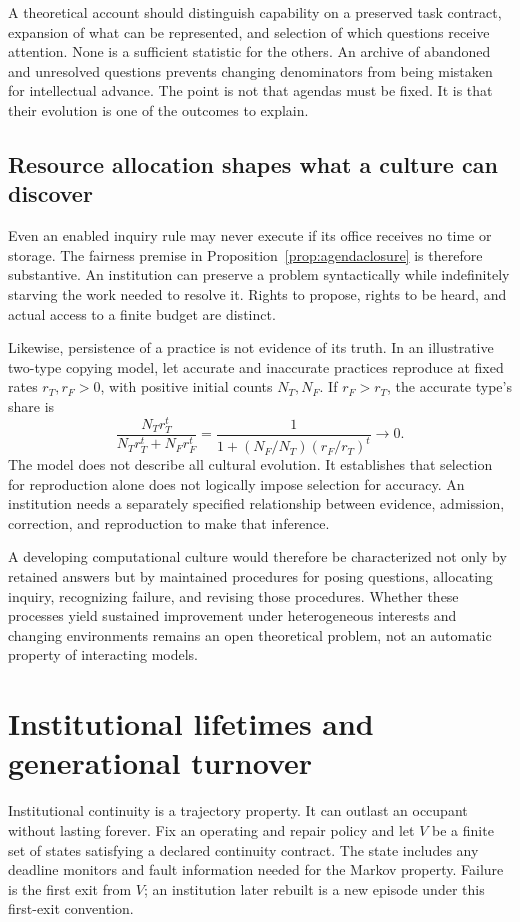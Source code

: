 \documentclass[11pt,letterpaper]{article}
\theoremstyle{plain}
\theoremstyle{definition}
\theoremstyle{remark}
\begin{document}
A theoretical account should distinguish capability on a preserved task contract, expansion of what can be represented, and selection of which questions receive attention. None is a sufficient statistic for the others. An archive of abandoned and unresolved questions prevents changing denominators from being mistaken for intellectual advance. The point is not that agendas must be fixed. It is that their evolution is one of the outcomes to explain.

\subsection{Resource allocation shapes what a culture can discover}
Even an enabled inquiry rule may never execute if its office receives no time or storage. The fairness premise in Proposition~\ref{prop:agendaclosure} is therefore substantive. An institution can preserve a problem syntactically while indefinitely starving the work needed to resolve it. Rights to propose, rights to be heard, and actual access to a finite budget are distinct.

Likewise, persistence of a practice is not evidence of its truth. In an illustrative two-type copying model, let accurate and inaccurate practices reproduce at fixed rates $r_T,r_F>0$, with positive initial counts $N_T,N_F$. If $r_F>r_T$, the accurate type's share is
\[
\frac{N_T r_T^t}{N_T r_T^t+N_F r_F^t}
=\frac{1}{1+(N_F/N_T)(r_F/r_T)^t}\longrightarrow0.
\]
The model does not describe all cultural evolution. It establishes that selection for reproduction alone does not logically impose selection for accuracy. An institution needs a separately specified relationship between evidence, admission, correction, and reproduction to make that inference.

A developing computational culture would therefore be characterized not only by retained answers but by maintained procedures for posing questions, allocating inquiry, recognizing failure, and revising those procedures. Whether these processes yield sustained improvement under heterogeneous interests and changing environments remains an open theoretical problem, not an automatic property of interacting models.

\section{Institutional lifetimes and generational turnover}\label{sec:lifetime}
Institutional continuity is a trajectory property. It can outlast an occupant without lasting forever. Fix an operating and repair policy and let $V$ be a finite set of states satisfying a declared continuity contract. The state includes any deadline monitors and fault information needed for the Markov property. Failure is the first exit from $V$; an institution later rebuilt is a new episode under this first-exit convention.
\end{document}
